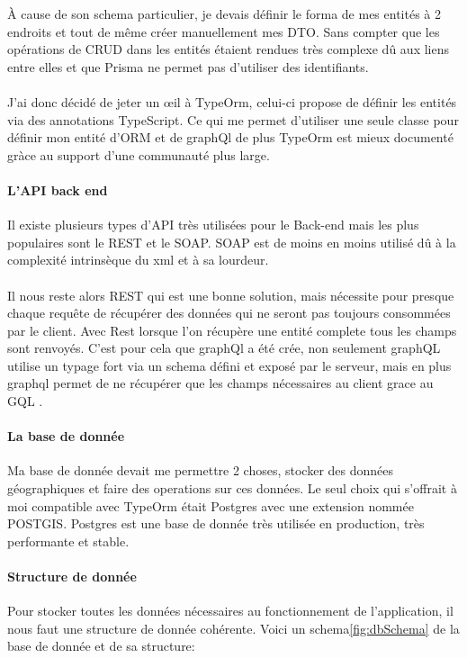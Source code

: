 À cause de son schema particulier, je devais définir le forma de mes entités à 2 endroits et tout de même créer manuellement mes DTO\@.
Sans compter que les opérations de CRUD dans les entités étaient rendues très complexe dû aux liens entre elles et que Prisma ne permet pas d'utiliser des identifiants.\\\\
J'ai donc décidé de jeter un œil à TypeOrm, celui-ci propose de définir les entités via des annotations TypeScript.
Ce qui me permet d'utiliser une seule classe pour définir mon entité d'ORM et de graphQl de plus TypeOrm est mieux
documenté gràce au support d'une communauté plus large.

\paragraph{L'API back end}
Il existe plusieurs types d'API très utilisées pour le Back-end mais les plus populaires sont le REST et le SOAP\@.
SOAP est de moins en moins utilisé dû à la complexité intrinsèque du xml et à sa lourdeur.\\\\
Il nous reste alors REST qui est une bonne solution, mais nécessite pour presque chaque requête de récupérer des données qui ne seront pas toujours consommées par le client.
Avec Rest lorsque l'on récupère une entité complete tous les champs sont renvoyés.
C'est pour cela que graphQl a été crée, non seulement graphQL utilise un typage fort via un schema défini et exposé par le serveur,
mais en plus graphql permet de ne récupérer que les champs nécessaires au client grace au GQL .

\paragraph{La base de donnée}
Ma base de donnée devait me permettre 2 choses, stocker des données géographiques et faire des operations sur ces données.
Le seul choix qui s'offrait à moi compatible avec TypeOrm était Postgres avec une extension nommée POSTGIS\@.
Postgres est une base de donnée très utilisée en production, très performante et stable.

\paragraph{Structure de donnée}
Pour stocker toutes les données nécessaires au fonctionnement de l'application, il nous faut une structure de donnée cohérente.
Voici un schema\ref{fig:dbSchema} de la base de donnée et de sa structure:

